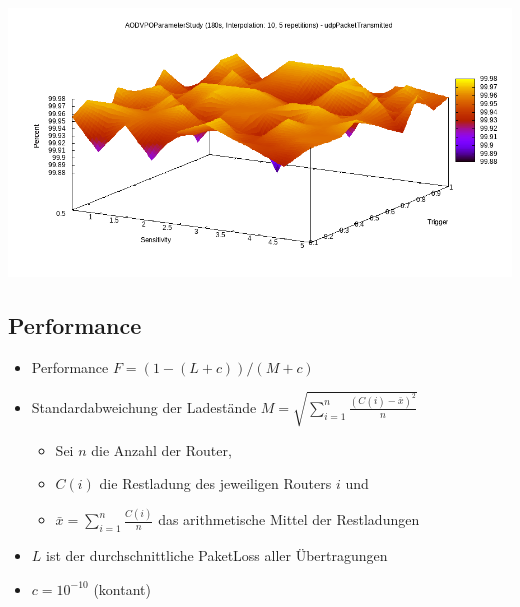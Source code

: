 \documentclass[11pt,landscape]{beamer}
\begin{document}
\begin{frame}{\insertsubsection}
\includegraphics[scale=0.45]{aodvstudyudp}
\end{frame}


\subsection{Performance}

\begin{frame}{\insertsubsection}
\begin{itemize}
\item Performance $F = ( 1 - ( L + c ) ) / ( M + c )$\newline
\item Standardabweichung der Ladestände $M = \sqrt{\sum_{i=1}^{n} \frac{(C(i)-\bar{x})^2}{n}}$
\begin{itemize}
\item Sei $n$ die Anzahl der Router,
\item $C(i)$ die Restladung des jeweiligen Routers $i$ und 
\item $\bar{x} = \sum_{i=1}^{n} \frac{C(i)}{n}$ das arithmetische Mittel der Restladungen\newline
\end{itemize}
\item $L$ ist der durchschnittliche PaketLoss aller Übertragungen\newline
\item $c = 10^{-10}$ (kontant)
\end{itemize}
\end{frame}
\end{document}

